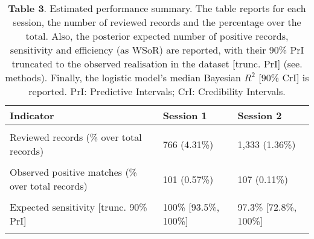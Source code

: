 \documentclass[]{bmcart}
\begin{document}
\begin{backmatter}
\begin{table}[H]
\caption{\label{tab:Table 3}\textbf{Table 3}. Estimated performance summary. The table reports for each session, the number of reviewed records and the percentage over the total. Also, the posterior expected number of positive records, sensitivity and efficiency (as WSoR) are reported, with their 90\% PrI truncated to the observed realisation in the dataset [trunc. PrI] (see. methods). Finally, the logistic model's median Bayesian $R^2$ [90\% CrI] is reported. PrI: Predictive Intervals; CrI: Credibility Intervals.}
\centering
\begin{tabular}[t]{lll}
\toprule
Indicator & Session 1 & Session 2\\
\midrule
\cellcolor{gray!6}{Total records} & \cellcolor{gray!6}{17,755} & \cellcolor{gray!6}{98,371}\\
Reviewed records (\% over total records) & 766 (4.31\%) & 1,333 (1.36\%)\\
\cellcolor{gray!6}{Expected efficiency (over random) [trunc. 90\% PrI]} & \cellcolor{gray!6}{95.6\% [95.3\%, 95.7\%]} & \cellcolor{gray!6}{98.6\% [98.1\%, 98.6\%]}\\
Observed positive matches (\% over total records) & 101 (0.57\%) & 107 (0.11\%)\\
\cellcolor{gray!6}{Predicted positive matches [trunc. 90\% PrI]} & \cellcolor{gray!6}{101 [101, 108]} & \cellcolor{gray!6}{110 [107, 147]}\\
\addlinespace
Expected sensitivity [trunc. 90\% PrI] & 100\% [93.5\%, 100\%] & 97.3\% [72.8\%, 100\%]\\
\cellcolor{gray!6}{Simple Model $R^2$ [90\% CrI]} & \cellcolor{gray!6}{98.1\% [97.4\%, 98.3\%]} & \cellcolor{gray!6}{98.2\% [97.6\%, 98.3\%]}\\
\bottomrule
\end{tabular}
\end{table}


\end{backmatter}
\end{document}
